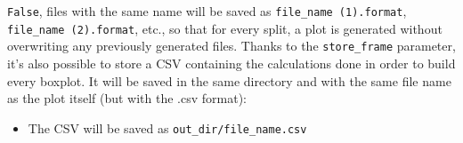 \documentclass[11pt]{article}
\begin{document}
\texttt{False}, files with the same name will be saved as \texttt{file\_name (1).format}, \texttt{file\_name (2).format},
etc., so that for every split, a plot is generated without overwriting any previously generated files.
Thanks to the \texttt{store\_frame} parameter, it's also possible to store a CSV containing the calculations done in
order to build every boxplot.
It will be saved in the same directory and with the same file name as the plot itself
(but with the .csv format):
\begin{itemize}
    \item The CSV will be saved as \texttt{out\_dir/file\_name.csv}
\end{itemize}
\hfill\break
\hfill\break

\end{document}
